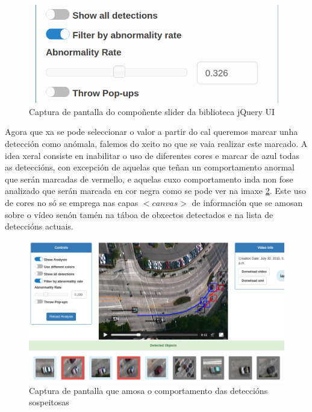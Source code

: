     \begin{figure}[htp]
    \begin{center}
        \includegraphics[scale=0.5]{figures/sliderCapture.png}
        \caption{Captura de pantalla do compoñente slider da biblioteca jQuery UI}
    \label{fig:sliderCapture}
    \end{center}
    \end{figure}
    
    Agora que xa se pode seleccionar o valor a partir do cal queremos marcar unha detección como
    anómala, falemos do xeito no que se vaia realizar este marcado. A idea xeral consiste en 
    inabilitar o uso de diferentes cores e marcar de azul todas as deteccións, con excepción de 
    aquelas que teñan un comportamento anormal que serán marcadas de vermello, e aquelas cuxo 
    comportamento inda non fose analizado que serán marcada en cor negra como se pode ver na imaxe
    \ref{fig:suspiciousDetections}. Este uso de cores no só
    se emprega nas capas $<canvas>$ de información que se amosan sobre o vídeo senón tamén na táboa
    de obxectos detectados e na lista de deteccións actuais.

    \begin{figure}[htp]
    \begin{center}
        \includegraphics[scale=0.4]{figures/suspiciousDetections.png}
        \caption{Captura de pantalla que amosa o comportamento das deteccións sospeitosas}
    \label{fig:suspiciousDetections}
    \end{center}
    \end{figure}
    
